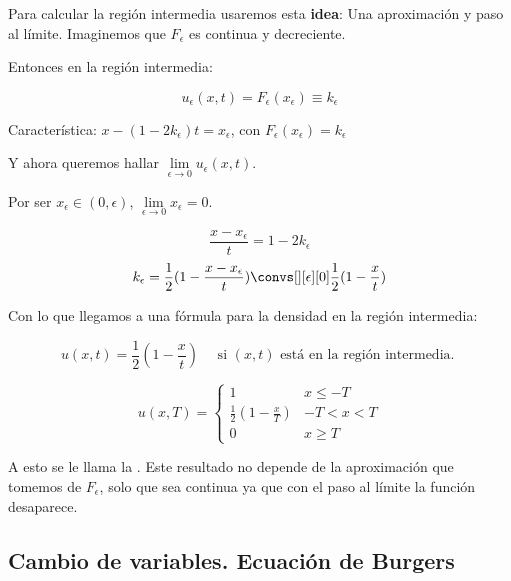 			Para calcular la región intermedia usaremos esta \textbf{idea}: Una aproximación y paso al límite. Imaginemos que $F_\epsilon$ es continua y decreciente.

			\begin{figure}[hbtp]
				\centering
				\caption{}
				\label{fig:FEpsilon}
			\end{figure}

			Entonces en la región intermedia:

			$$u_\epsilon (x,t) = F_\epsilon (x_\epsilon) \equiv k_\epsilon $$

			Característica: $x - (1-2k_\epsilon) t = x_\epsilon$, con $F_\epsilon(x_\epsilon) = k_\epsilon$

			Y ahora queremos hallar $\lim\limits_{\epsilon \rightarrow 0} u_\epsilon(x,t)$.

			Por ser $x_\epsilon \in (0,\epsilon)$, $\lim\limits_{\epsilon \rightarrow 0} x_\epsilon = 0$.

			$$ \frac{x - x_\epsilon}{t} = 1-2k_\epsilon$$
			$$k_\epsilon = \frac{1}{2} (1 - \frac{x-x_\epsilon}{t}) \convs[][\epsilon][0] \frac{1}{2} (1 - \frac{x}{t})$$

			Con lo que llegamos a una fórmula para la densidad en la región intermedia:

			$$u(x,t) = \frac{1}{2} (1 - \frac{x}{t}) \quad \text{ si } (x,t) \text{ está en la región intermedia. }$$

			\begin{figure}[hbtp]
				\centering
				\caption{}
				\label{fig:SolucionTFijo}
			\end{figure}

			$$u(x,T) =
			\begin{cases}
				1 & x \leq -T \\
				\frac{1}{2} (1 - \frac{x}{T}) & -T < x < T \\
				0 & x \geq T
			\end{cases}
			$$

			A esto se le llama la . Este resultado no depende de la aproximación que tomemos de $F_\epsilon$, solo que sea continua ya que con el paso al límite la función desaparece.



	\subsection{Cambio de variables. Ecuación de Burgers}

